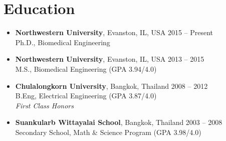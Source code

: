 \section{\sc Education}

\begin{itemize}[leftmargin=0cm, label={}]

\item {\bf Northwestern University}, Evanston, IL, USA \hfill 2015 -- Present \\
Ph.D., Biomedical Engineering

\item {\bf Northwestern University}, Evanston, IL, USA \hfill 2013 -- 2015 \\
M.S., Biomedical Engineering \hfill (GPA 3.94/4.0)

\item {\bf Chulalongkorn University}, Bangkok, Thailand \hfill 2008 -- 2012 \\
B.Eng, Electrical Engineering \hfill (GPA 3.87/4.0)\\
{\em First Class Honors}

\item {\bf Suankularb Wittayalai School}, Bangkok, Thailand \hfill 2003 -- 2008 \\
Secondary School, Math \& Science Program \hfill(GPA 3.98/4.0)

\end{itemize}
